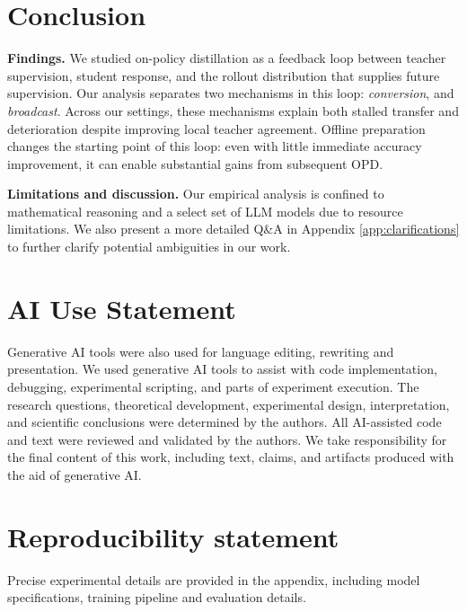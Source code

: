 \section{Conclusion}
\label{sec:conclusion}



\textbf{Findings.}
We studied on-policy distillation as a feedback loop between teacher supervision, student response, and the rollout distribution that supplies future supervision.
Our analysis separates two mechanisms in this loop: \emph{conversion}, and \emph{broadcast}. Across our settings, these mechanisms explain both stalled transfer and deterioration despite improving local teacher agreement. Offline preparation changes the starting point of this loop: even with little immediate accuracy improvement, it can enable
substantial gains from subsequent OPD.

\textbf{Limitations and discussion.}
Our empirical analysis is confined to mathematical reasoning and a select set of LLM models due to resource limitations. We also present a more detailed Q\&A in Appendix \ref{app:clarifications} to further clarify potential ambiguities in our work.  

\section*{AI Use Statement}
Generative AI tools were also used for language editing, rewriting and presentation. We used generative AI tools to assist with code implementation, debugging, experimental scripting, and parts of experiment execution.
The research questions, theoretical development, experimental design, interpretation, and scientific
conclusions were determined by the authors. All AI-assisted code and text were reviewed and validated by the authors. We take responsibility for the final content of this work, including text, claims, and artifacts produced with the aid of generative AI.

\section*{Reproducibility statement}

Precise experimental details are provided in the appendix, including model specifications, training pipeline and evaluation details.